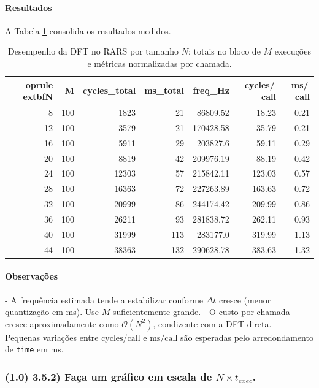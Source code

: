 \documentclass[12pt,a4paper]{article}
\begin{document}

\paragraph{Resultados}
A Tabela \ref{tab:bench_dft} consolida os resultados medidos.

\begin{table}[H]
\centering
\small
\begin{tabular}{@{}r r r r r r r@{}}
	oprule
	extbf{N} & \textbf{M} & \textbf{cycles\_total} & \textbf{ms\_total} & \textbf{freq\_Hz} & \textbf{cycles/\,call} & \textbf{ms/\,call} \\
\midrule
8 & 100 & 1823 & 21 & 86809.52 & 18.23 & 0.21 \\
12 & 100 & 3579 & 21 & 170428.58 & 35.79 & 0.21 \\
16 & 100 & 5911 & 29 & 203827.6 & 59.11 & 0.29 \\
20 & 100 & 8819 & 42 & 209976.19 & 88.19 & 0.42 \\
24 & 100 & 12303 & 57 & 215842.11 & 123.03 & 0.57 \\
28 & 100 & 16363 & 72 & 227263.89 & 163.63 & 0.72 \\
32 & 100 & 20999 & 86 & 244174.42 & 209.99 & 0.86 \\
36 & 100 & 26211 & 93 & 281838.72 & 262.11 & 0.93 \\
40 & 100 & 31999 & 113 & 283177.0 & 319.99 & 1.13 \\
44 & 100 & 38363 & 132 & 290628.78 & 383.63 & 1.32 \\
\bottomrule
\end{tabular}
\caption{Desempenho da DFT no RARS por tamanho \(N\): totais no bloco de \(M\) execuções e métricas normalizadas por chamada.}
\label{tab:bench_dft}
\end{table}

\paragraph{Observações}
- A frequência estimada tende a estabilizar conforme \(\Delta\!t\) cresce (menor quantização em ms). Use \(M\) suficientemente grande.
- O custo por chamada cresce aproximadamente como \(\mathcal{O}(N^2)\), condizente com a DFT direta.
- Pequenas variações entre \(\text{cycles}/\text{call}\) e \(\text{ms}/\text{call}\) são esperadas pelo arredondamento de \texttt{time} em ms.
\subsubsection*{(1.0) 3.5.2) Faça um gráfico em escala de $N \times t_{exec}$.}
\end{document}
